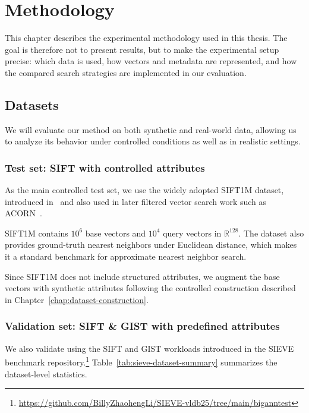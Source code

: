 \chapter{Methodology}\label{chap:methodology}

This chapter describes the experimental methodology used in this thesis. 
The goal is therefore not to present results, but to make the experimental setup precise: which data is used, how vectors and metadata are represented, and how the compared search strategies are implemented in our evaluation.

\section{Datasets}\label{sec:dataset}

We will evaluate our method on both synthetic and real-world data, allowing us to analyze its behavior under controlled conditions as well as in realistic settings.

\subsection{Test set: \textsc{SIFT} with controlled attributes}
\label{subsec:sift1m}

As the main controlled test set, we use the widely adopted \textsc{SIFT1M} dataset, introduced in~\cite{jegou2010product} and also used in later filtered vector search work such as ACORN~\cite{acorn}.

\textsc{SIFT1M} contains \(10^6\) base vectors and \(10^4\) query vectors in \(\mathbb{R}^{128}\).
The dataset also provides ground-truth nearest neighbors under Euclidean distance, which makes it a standard benchmark for approximate nearest neighbor search.

Since \textsc{SIFT1M} does not include structured attributes, we augment the base vectors with synthetic attributes following the controlled construction described in Chapter~\ref{chap:dataset-construction}.

\subsection{Validation set: \textsc{SIFT} \& \textsc{GIST} with predefined attributes}
\label{subsec:sift-and-gist}

We also validate using the \textsc{SIFT} and \textsc{GIST} workloads introduced in the SIEVE benchmark repository.\footnote{\url{https://github.com/BillyZhaohengLi/SIEVE-vldb25/tree/main/biganntest}}
Table~\ref{tab:sieve-dataset-summary} summarizes the dataset-level statistics.

